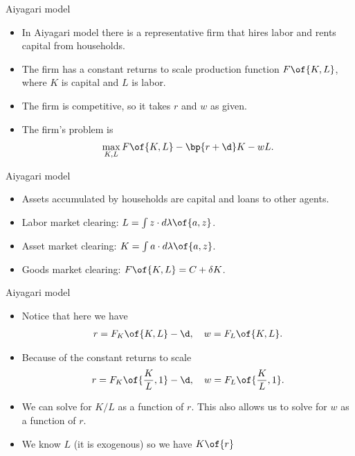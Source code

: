 \documentclass[11pt,xcolor={dvipsnames},aspectratio=159,hyperref={pdftex,pdfpagemode=UseNone,hidelinks,pdfdisplaydoctitle=true},usepdftitle=false]{beamer}
\begin{document}
    \begin{frame}{Aiyagari model}
        \begin{itemize}
            \item In Aiyagari model there is a representative firm that hires labor and rents capital from households.
            \item The firm has a constant returns to scale production function $F\of{K,L}$, where $K$ is capital and $L$ is labor.
            \item The firm is competitive, so it takes $r$ and $w$ as given.
            \item The firm's problem is \begin{align*}
                \max_{K,L} F\of{K,L} - \bp{r+\d}K - wL.
            \end{align*}
        \end{itemize}
        \end{frame}

    \begin{frame}{Aiyagari model}
        \begin{itemize}
            \item Assets accumulated by households are capital and loans to other agents.
            \item Labor market clearing: $L = \int z \cdot d\lambda\of{a,z}$.
            \item Asset market clearing: $K = \int a \cdot d\lambda\of{a,z}$.
            \item Goods market clearing: $F\of{K,L} = C + \delta K$.
        \end{itemize}
        \end{frame}

        \begin{frame}{Aiyagari model}
        \begin{itemize}
            \item Notice that here we have \begin{align*}
                r = F_K\of{K,L} - \d, \quad w = F_L\of{K,L}.
            \end{align*}
            \item Because of the constant returns to scale \begin{align*}
                r = F_K\of{\frac{K}{L},1} - \d, \quad w = F_L\of{\frac{K}{L},1} .
            \end{align*}
            \item We can solve for $K/L$ as a function of $r$. This also allows us to solve for $w$ as a function of $r$.
            \item We know $L$ (it is exogenous) so we have $K\of{r}$ 
        \end{itemize}
        \end{frame}
\end{document}
